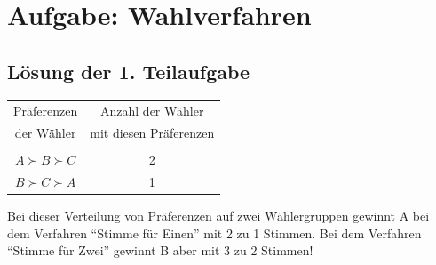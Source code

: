 \documentclass[10pt, a4paper, german]{article}
\numberwithin {equation}{section}
\begin{document}
\section{Aufgabe: Wahlverfahren}




\subsection{Lösung der 1. Teilaufgabe}

\begin{center}
\begin{tabular}{c|c}
Präferenzen & Anzahl der Wähler \\
der Wähler  & mit diesen Präferenzen \\
\cline{1-2}
 & \\ 
$A \succ B \succ C$ & 2 \\
$B \succ C \succ A$ & 1 \\
\end{tabular}
\end{center}

Bei dieser Verteilung von Präferenzen auf zwei Wählergruppen gewinnt A
bei dem Verfahren ``Stimme für Einen'' mit 2 zu 1 Stimmen. Bei dem
Verfahren ``Stimme für Zwei'' gewinnt B aber mit 3 zu 2 Stimmen!
\end{document}
